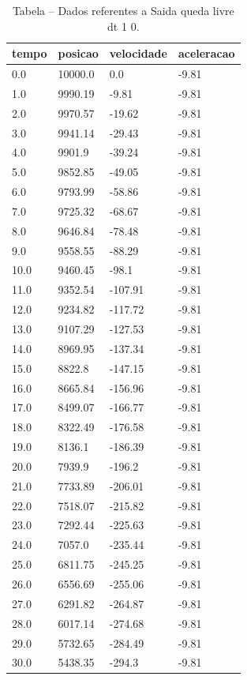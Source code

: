 \begin{table}[H]
\centering
\caption{Tabela – Dados referentes a Saida queda livre dt 1 0.}
\label{tab:saida_queda_livre_dt_1_0}
\begin{tabular}{llll}
\toprule
tempo & posicao & velocidade & aceleracao \\
\midrule
0.0 & 10000.0 & 0.0 & -9.81 \\
1.0 & 9990.19 & -9.81 & -9.81 \\
2.0 & 9970.57 & -19.62 & -9.81 \\
3.0 & 9941.14 & -29.43 & -9.81 \\
4.0 & 9901.9 & -39.24 & -9.81 \\
5.0 & 9852.85 & -49.05 & -9.81 \\
6.0 & 9793.99 & -58.86 & -9.81 \\
7.0 & 9725.32 & -68.67 & -9.81 \\
8.0 & 9646.84 & -78.48 & -9.81 \\
9.0 & 9558.55 & -88.29 & -9.81 \\
10.0 & 9460.45 & -98.1 & -9.81 \\
11.0 & 9352.54 & -107.91 & -9.81 \\
12.0 & 9234.82 & -117.72 & -9.81 \\
13.0 & 9107.29 & -127.53 & -9.81 \\
14.0 & 8969.95 & -137.34 & -9.81 \\
15.0 & 8822.8 & -147.15 & -9.81 \\
16.0 & 8665.84 & -156.96 & -9.81 \\
17.0 & 8499.07 & -166.77 & -9.81 \\
18.0 & 8322.49 & -176.58 & -9.81 \\
19.0 & 8136.1 & -186.39 & -9.81 \\
20.0 & 7939.9 & -196.2 & -9.81 \\
21.0 & 7733.89 & -206.01 & -9.81 \\
22.0 & 7518.07 & -215.82 & -9.81 \\
23.0 & 7292.44 & -225.63 & -9.81 \\
24.0 & 7057.0 & -235.44 & -9.81 \\
25.0 & 6811.75 & -245.25 & -9.81 \\
26.0 & 6556.69 & -255.06 & -9.81 \\
27.0 & 6291.82 & -264.87 & -9.81 \\
28.0 & 6017.14 & -274.68 & -9.81 \\
29.0 & 5732.65 & -284.49 & -9.81 \\
30.0 & 5438.35 & -294.3 & -9.81 \\

\end{tabular}
\end{table}
